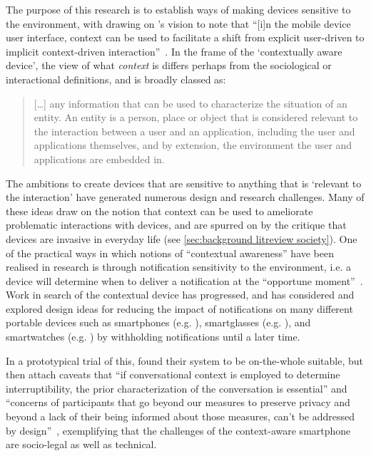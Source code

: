 The purpose of this research is to establish ways of making devices sensitive to the environment, with \citet{Gellersen2002} drawing on \citet{Weiser1991}'s vision to note that ``[i]n the mobile device user interface, context can be used to facilitate a shift from explicit user-driven to implicit context-driven interaction''~\citep[p. 341]{Gellersen2002}.
In the frame of the `contextually aware device', the view of what \textit{context} is differs perhaps from the sociological or interactional definitions, and is broadly classed as:
\begin{quote}
    [\ldots] any information that can be used to characterize the situation of an entity. An entity is a person, place or object that is considered relevant to the interaction between a user and an application, including the user and applications themselves, and by extension, the environment the user and applications are embedded in.
\end{quote}
The ambitions to create devices that are sensitive to anything that is `relevant to the interaction' have generated numerous design and research challenges.
Many of these ideas draw on the notion that context can be used to ameliorate problematic interactions with devices, and are spurred on by the critique that devices are invasive in everyday life (see \ref{sec:background litreview society}).
One of the practical ways in which notions of ``contextual awareness'' have been realised in research is through notification sensitivity to the environment, i.e. a device will determine when to deliver a notification at the ``opportune moment''~\citep[pp. 57--64]{Fischer2011}.
Work in search of the contextual device has progressed, and has considered and explored design ideas for reducing the impact of notifications on many different portable devices such as smartphones (e.g. \citet{Okoshi2016}), smartglasses (e.g. \citet{Kern2003,Lucero2014}), and smartwatches (e.g. \citet{Lee2016a}) by withholding notifications until a later time.

In a prototypical trial of this, \citet{Schulze2016} found their system to be on-the-whole suitable, but then attach caveats that ``if conversational context is employed to determine interruptibility, the prior characterization of the conversation is essential'' and ``concerns of participants that go beyond our measures to preserve privacy and beyond a lack of their being informed about those measures, can’t be addressed by design''~\citep[p. 9]{Schulze2016}, exemplifying that the challenges of the context-aware smartphone are socio-legal as well as technical.

